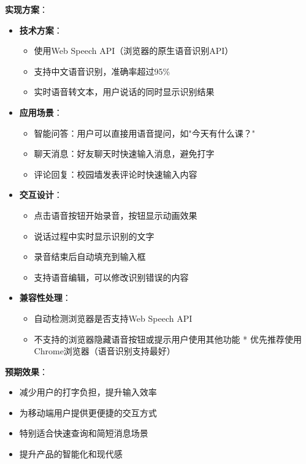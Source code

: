 \documentclass[12pt,a4paper]{article}
\begin{document}
\textbf{实现方案}：
\begin{itemize}
    \item \textbf{技术方案}：
        \begin{itemize}
            \item 使用Web Speech API（浏览器的原生语音识别API）
            \item 支持中文语音识别，准确率超过95\%
            \item 实时语音转文本，用户说话的同时显示识别结果
        \end{itemize}
    \item \textbf{应用场景}：
        \begin{itemize}
            \item 智能问答：用户可以直接用语音提问，如"今天有什么课？"
            \item 聊天消息：好友聊天时快速输入消息，避免打字
            \item 评论回复：校园墙发表评论时快速输入内容
        \end{itemize}
    \item \textbf{交互设计}：
        \begin{itemize}
            \item 点击语音按钮开始录音，按钮显示动画效果
            \item 说话过程中实时显示识别的文字
            \item 录音结束后自动填充到输入框
            \item 支持语音编辑，可以修改识别错误的内容
        \end{itemize}
    \item \textbf{兼容性处理}：
        \begin{itemize}
            \item 自动检测浏览器是否支持Web Speech API
            \item 不支持的浏览器隐藏语音按钮或提示用户使用其他功能
            * 优先推荐使用Chrome浏览器（语音识别支持最好）
        \end{itemize}
\end{itemize}

\textbf{预期效果}：
\begin{itemize}
    \item 减少用户的打字负担，提升输入效率
    \item 为移动端用户提供更便捷的交互方式
    \item 特别适合快速查询和简短消息场景
    \item 提升产品的智能化和现代感
\end{itemize}
\end{document}
